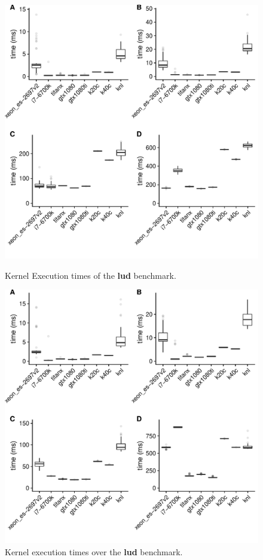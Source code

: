 \documentclass[../document.tex]{subfiles}
\begin{document}
\label{ssec:time}

\begin{figure}
\begin{minipage}[b]{.45\textwidth}
\centering
\includegraphics[width=1\textwidth]{figures/time-results/kmeans.pdf}
\caption{Kernel Execution times of the {\bf lud} benchmark.}
\label{fig:time-kmeans}
\end{minipage}
\hfill
\begin{minipage}[b]{.45\textwidth}
\centering
\includegraphics[width=1\textwidth]{figures/time-results/lud.pdf}
\caption{Kernel execution times over the {\bf lud} benchmark.}
\label{fig:time-lud}
\end{minipage}
\end{figure}
\end{document}
